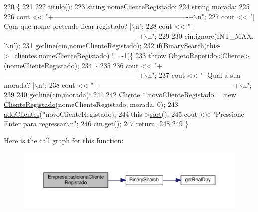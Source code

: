 \begin{DoxyCode}
220                                        \{
221 
222     \hyperlink{classEmpresa_ad79f7196a8ce7256771cbd7b9542155c}{titulo}();
223     \textcolor{keywordtype}{string} nomeClienteRegistado;
224     \textcolor{keywordtype}{string} morada;
225 
226     cout << \textcolor{stringliteral}{"+----------------------------------------------------------+\(\backslash\)n"};
227     cout << \textcolor{stringliteral}{"| Com que nome pretende ficar registado?                   |\(\backslash\)n"};
228     cout << \textcolor{stringliteral}{"+----------------------------------------------------------+\(\backslash\)n"};
229 
230     cin.ignore(INT\_MAX, \textcolor{charliteral}{'\(\backslash\)n'});
231     getline(cin,nomeClienteRegistado);
232     \textcolor{keywordflow}{if}(\hyperlink{extras_8h_abc85c93edf561168b5bbee8054caa388}{BinarySearch}(this->\_clientes,nomeClienteRegistado) != -1)\{
233         \textcolor{keywordflow}{throw} \hyperlink{classObjetoRepetido}{ObjetoRepetido<Cliente>}(nomeClienteRegistado);
234     \}
235 
236     cout << \textcolor{stringliteral}{"+----------------------------------------------------------+\(\backslash\)n"};
237     cout << \textcolor{stringliteral}{"| Qual a sua morada?                                       |\(\backslash\)n"};
238     cout << \textcolor{stringliteral}{"+----------------------------------------------------------+\(\backslash\)n"};
239 
240     getline(cin,morada);
241 
242     \hyperlink{classCliente}{Cliente} * novoClienteRegistado = \textcolor{keyword}{new} \hyperlink{classClienteRegistado}{ClienteRegistado}(nomeClienteRegistado,
      morada, 0);
243     \hyperlink{classEmpresa_a57597ec4154f274686bc648ccf5d2a59}{addClientes}(*novoClienteRegistado);
244     this->\hyperlink{classEmpresa_aa7424cde3bdf1b1921967bc176d0ab50}{sort}();
245     cout << \textcolor{stringliteral}{"Pressione Enter para regressar\(\backslash\)n"};
246     cin.get();
247     \textcolor{keywordflow}{return};
248 
249 \}
\end{DoxyCode}


Here is the call graph for this function\+:\nopagebreak
\begin{figure}[H]
\begin{center}
\leavevmode
\includegraphics[width=350pt]{classEmpresa_a430c00a63ef70338de3b4b7c096ea194_cgraph}
\end{center}
\end{figure}


